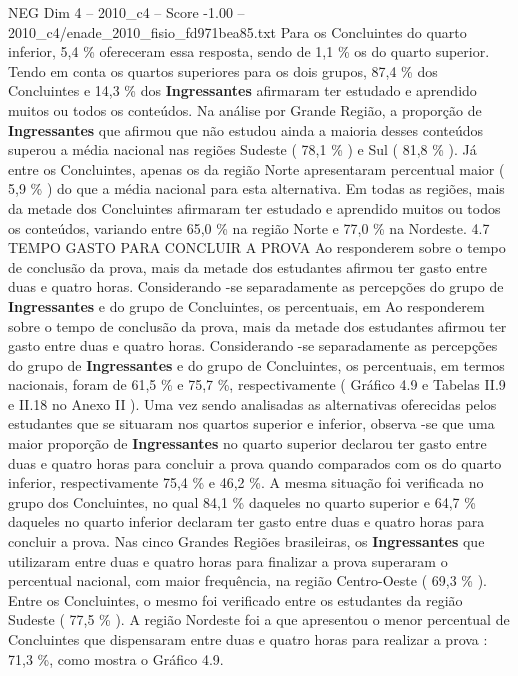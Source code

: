 \begin{textsample}{NEG Dim 4 – 2010\_c4 – Score -1.00 – 2010\_c4/enade\_2010\_fisio\_fd971bea85.txt}
Para os Concluintes do quarto inferior, 5,4 \% ofereceram essa resposta, sendo de 1,1 \% os do quarto superior.
Tendo em conta os quartos superiores para os dois grupos, 87,4 \% dos Concluintes e 14,3 \% dos \textbf{Ingressantes} afirmaram ter estudado e aprendido muitos ou todos os conteúdos.
Na análise por Grande Região, a proporção de \textbf{Ingressantes} que afirmou que não estudou ainda a maioria desses conteúdos superou a média nacional nas regiões Sudeste ( 78,1 \% ) e Sul ( 81,8 \% ).
Já entre os Concluintes, apenas os da região Norte apresentaram percentual maior ( 5,9 \% ) do que a média nacional para esta alternativa.
Em todas as regiões, mais da metade dos Concluintes afirmaram ter estudado e aprendido muitos ou todos os conteúdos, variando entre 65,0 \% na região Norte e 77,0 \% na Nordeste. 4.7 TEMPO GASTO PARA CONCLUIR A PROVA Ao responderem sobre o tempo de conclusão da prova, mais da metade dos estudantes afirmou ter gasto entre duas e quatro horas.
Considerando -se separadamente as percepções do grupo de \textbf{Ingressantes} e do grupo de Concluintes, os percentuais, em Ao responderem sobre o tempo de conclusão da prova, mais da metade dos estudantes afirmou ter gasto entre duas e quatro horas.
Considerando -se separadamente as percepções do grupo de \textbf{Ingressantes} e do grupo de Concluintes, os percentuais, em termos nacionais, foram de 61,5 \% e 75,7 \%, respectivamente ( Gráfico 4.9 e Tabelas II.9 e II.18 no Anexo II ).
Uma vez sendo analisadas as alternativas oferecidas pelos estudantes que se situaram nos quartos superior e inferior, observa -se que uma maior proporção de \textbf{Ingressantes} no quarto superior declarou ter gasto entre duas e quatro horas para concluir a prova quando comparados com os do quarto inferior, respectivamente 75,4 \% e 46,2 \%.
A mesma situação foi verificada no grupo dos Concluintes, no qual 84,1 \% daqueles no quarto superior e 64,7 \% daqueles no quarto inferior declaram ter gasto entre duas e quatro horas para concluir a prova.
Nas cinco Grandes Regiões brasileiras, os \textbf{Ingressantes} que utilizaram entre duas e quatro horas para finalizar a prova superaram o percentual nacional, com maior frequência, na região Centro-Oeste ( 69,3 \% ).
Entre os Concluintes, o mesmo foi verificado entre os estudantes da região Sudeste ( 77,5 \% ).
A região Nordeste foi a que apresentou o menor percentual de Concluintes que dispensaram entre duas e quatro horas para realizar a prova : 71,3 \%, como mostra o Gráfico 4.9.

\end{textsample}
